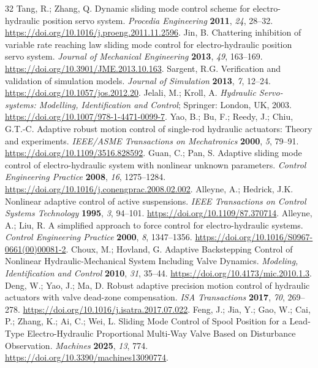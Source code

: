 \documentclass[machines,article,submit,pdftex,moreauthors]{Definitions/mdpi}
\begin{document}
\begin{thebibliography}{32}
 Tang, R.; Zhang, Q. Dynamic sliding mode control scheme for electro-hydraulic position servo system. \emph{Procedia Engineering} \textbf{2011}, \emph{24}, 28--32. \url{https://doi.org/10.1016/j.proeng.2011.11.2596}.
 Jin, B. Chattering inhibition of variable rate reaching law sliding mode control for electro-hydraulic position servo system. \emph{Journal of Mechanical Engineering} \textbf{2013}, \emph{49}, 163--169. \url{https://doi.org/10.3901/JME.2013.10.163}.
 Sargent, R.G. Verification and validation of simulation models. \emph{Journal of Simulation} \textbf{2013}, \emph{7}, 12--24. \url{https://doi.org/10.1057/jos.2012.20}.
 Jelali, M.; Kroll, A. \emph{Hydraulic Servo-systems: Modelling, Identification and Control}; Springer: London, UK, 2003. \url{https://doi.org/10.1007/978-1-4471-0099-7}.
 Yao, B.; Bu, F.; Reedy, J.; Chiu, G.T.-C. Adaptive robust motion control of single-rod hydraulic actuators: Theory and experiments. \emph{IEEE/ASME Transactions on Mechatronics} \textbf{2000}, \emph{5}, 79--91. \url{https://doi.org/10.1109/3516.828592}.
 Guan, C.; Pan, S. Adaptive sliding mode control of electro-hydraulic system with nonlinear unknown parameters. \emph{Control Engineering Practice} \textbf{2008}, \emph{16}, 1275--1284. \url{https://doi.org/10.1016/j.conengprac.2008.02.002}.
 Alleyne, A.; Hedrick, J.K. Nonlinear adaptive control of active suspensions. \emph{IEEE Transactions on Control Systems Technology} \textbf{1995}, \emph{3}, 94--101. \url{https://doi.org/10.1109/87.370714}.
 Alleyne, A.; Liu, R. A simplified approach to force control for electro-hydraulic systems. \emph{Control Engineering Practice} \textbf{2000}, \emph{8}, 1347--1356. \url{https://doi.org/10.1016/S0967-0661(00)00081-2}.
 Choux, M.; Hovland, G. Adaptive Backstepping Control of Nonlinear Hydraulic-Mechanical System Including Valve Dynamics. \emph{Modeling, Identification and Control} \textbf{2010}, \emph{31}, 35--44. \url{https://doi.org/10.4173/mic.2010.1.3}.
 Deng, W.; Yao, J.; Ma, D. Robust adaptive precision motion control of hydraulic actuators with valve dead-zone compensation. \emph{ISA Transactions} \textbf{2017}, \emph{70}, 269--278. \url{https://doi.org/10.1016/j.isatra.2017.07.022}.
 Feng, J.; Jia, Y.; Gao, W.; Cai, P.; Zhang, K.; Ai, C.; Wei, L. Sliding Mode Control of Spool Position for a Lead-Type Electro-Hydraulic Proportional Multi-Way Valve Based on Disturbance Observation. \emph{Machines} \textbf{2025}, \emph{13}, 774. \url{https://doi.org/10.3390/machines13090774}.

\end{thebibliography}
\end{document}
